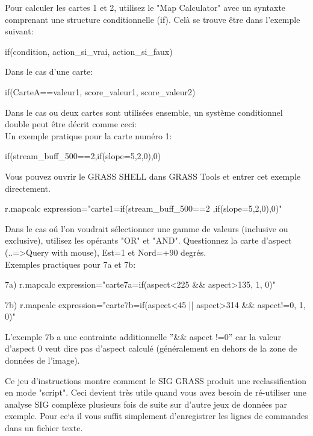 Pour calculer les cartes 1 et 2, utilisez le "Map Calculator" avec un syntaxte comprenant une structure conditionnelle (if). Cel\`a se trouve \^etre dans l'exemple suivant:
\begin{smallverbatim}
if(condition, action_si_vrai, action_si_faux)
\end{smallverbatim}
Dans le cas d'une carte:
\begin{smallverbatim}
if(CarteA==valeur1, score_valeur1, score_valeur2)
\end{smallverbatim}
Dans le cas ou deux cartes sont utilis\'ees ensemble, un syst\`eme conditionnel double peut \^etre d\'ecrit comme ceci:\\

\noindent Un exemple pratique pour la carte num\'ero 1:
\begin{smallverbatim}
if(stream_buff_500==2,if(slope=5,2,0),0)
\end{smallverbatim}
\smallskip
\noindent Vous pouvez ouvrir le GRASS SHELL dans GRASS Tools et entrer cet exemple directement.
\begin{smallverbatim}
r.mapcalc expression="carte1=if(stream_buff_500==2
          ,if(slope=5,2,0),0)"
\end{smallverbatim}

\noindent Dans le cas o\'u l'on voudrait s\'electionner une gamme de valeurs (inclusive ou exclusive), utilisez les op\'erants "OR" et "AND". Questionnez la carte d'aspect (..=>Query with mouse), Est=1 et Nord=+90 degr\'es.\\

\noindent Exemples practiques pour 7a et 7b:
\begin{smallverbatim}
7a) r.mapcalc expression="carte7a=if(aspect<225 
          && aspect>135, 1, 0)"

7b) r.mapcalc expression="carte7b=if(aspect<45 ||
          aspect>314 && aspect!=0, 1, 0)"
\end{smallverbatim}
L'exemple 7b a une contrainte additionnelle ''\&\& aspect !=0'' car la valeur d'aspect 0 veut dire pas d'aspect calcul\'e (g\'en\'eralement en dehors de la zone de donn\'ees de l'image).

\noindent Ce jeu d'instructions montre comment le SIG GRASS produit une reclassification en mode "script". Ceci devient tr\`es utile quand vous avez besoin de r\'e-utiliser une analyse SIG compl\`exe plusieurs fois de suite sur d'autre jeux de donn\'ees par exemple. Pour ce`a il vous suffit simplement d'enregistrer les lignes de commandes dans un fichier texte.

